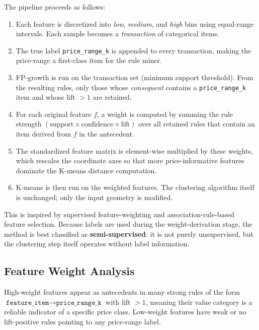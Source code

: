 \documentclass[11pt, a4paper]{article}
\begin{document}
The pipeline proceeds as follows:
\begin{enumerate}
    \item Each feature is discretized into \emph{low}, \emph{medium}, and \emph{high} bins
          using equal-range intervals. Each sample becomes a \emph{transaction} of categorical items.
    \item The true label \texttt{price\_range\_k} is appended to every transaction,
          making the price-range a first-class item for the rule miner.
    \item FP-growth is run on the transaction set (minimum support threshold).
          From the resulting rules, only those whose \emph{consequent} contains a
          \texttt{price\_range\_k} item and whose lift $>1$ are retained.
    \item For each original feature $f$, a weight is computed by summing the rule strength
          $(\text{support} \times \text{confidence} \times \text{lift})$ over all retained rules
          that contain an item derived from $f$ in the antecedent.
    \item The standardized feature matrix is element-wise multiplied by these weights,
          which rescales the coordinate axes so that more price-informative features
          dominate the K-means distance computation.
    \item K-means is then run on the weighted features.
          The clustering algorithm itself is unchanged; only the input geometry is modified.
\end{enumerate}
This is inspired by supervised feature-weighting and association-rule-based feature selection.
Because labels are used during the weight-derivation stage, the method is best classified as
\textbf{semi-supervised}: it is not purely unsupervised, but the clustering step itself
operates without label information.

\subsection*{Feature Weight Analysis}

High-weight features appear as antecedents in many strong rules of the form
$\texttt{feature\_item} \rightarrow \texttt{price\_range\_k}$ with lift $>1$,
meaning their value category is a reliable indicator of a specific price class.
Low-weight features have weak or no lift-positive rules pointing to any price-range label.
\end{document}
